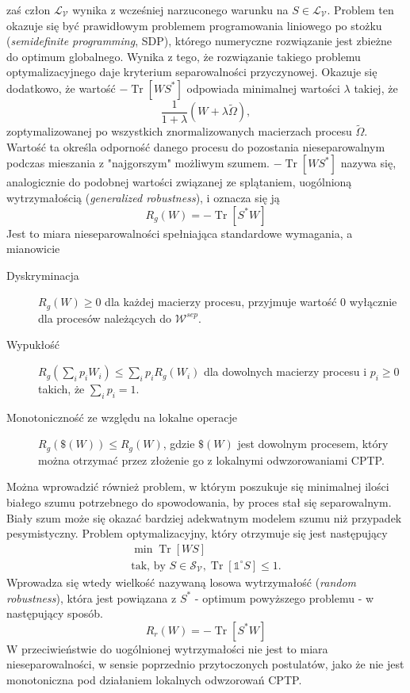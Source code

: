 \documentclass[10pt]{article} %
\DeclareMathOperator{\Trs}{Tr}
\newcommand{\IO}{\mathbb{1}^\circ}
\begin{document}
zaś człon $\mathcal{L_V}$ wynika z wcześniej narzuconego warunku na $S \in \mathcal{L_V}$. Problem ten okazuje się być prawidłowym problemem
programowania liniowego po stożku (\textit{semidefinite programming}, SDP), którego numeryczne rozwiązanie jest zbieżne do optimum globalnego.
Wynika z tego, że rozwiązanie takiego problemu optymalizacyjnego daje kryterium separowalności przyczynowej.
Okazuje się dodatkowo, że wartość $-\Trs \left[ W S^* \right]$ odpowiada minimalnej wartości $\lambda$ takiej, że 
\begin{equation}
\frac{1}{1 + \lambda}\left( W + \lambda\widetilde{\Omega}\right),
\end{equation}
zoptymalizowanej po wszystkich znormalizowanych macierzach procesu $\widetilde{\Omega}$. Wartość ta określa odporność danego procesu do pozostania nieseparowalnym podczas mieszania z "najgorszym" możliwym szumem. $-\Trs \left [ W S^* \right]$ nazywa się, analogicznie do podobnej wartości związanej ze splątaniem, uogólnioną wytrzymałością (\textit{generalized robustness}), i oznacza się ją
\begin{equation}
R_g(W) = -\Trs \left[ S^* W \right]
\end{equation} Jest to miara nieseparowalności spełniająca standardowe wymagania, a mianowicie
\begin{description}
\item[Dyskryminacja] $R_g(W) \geq 0$ dla każdej macierzy procesu, przyjmuje wartość 0 wyłącznie dla procesów należących do $\mathcal{W}^{sep}$. 
\item[Wypukłość] $R_g(\sum_i p_i W_i) \leq \sum_i p_i R_g(W_i)$ dla dowolnych macierzy procesu i $p_i \geq 0$ takich, że $\sum_i p_i = 1$. 
\item[Monotoniczność ze względu na lokalne operacje] $R_g\left(\$(W)\right) \leq R_g\left(W\right)$, gdzie $\$(W)$ jest dowolnym procesem, który można 
otrzymać przez złożenie go z lokalnymi odwzorowaniami CPTP.
\end{description}
Można wprowadzić również problem, w którym poszukuje się minimalnej ilości białego szumu potrzebnego do spowodowania, by proces stał się separowalnym. Biały szum może się okazać bardziej adekwatnym modelem szumu niż przypadek pesymistyczny.
Problem optymalizacyjny, który otrzymuje się jest następujący
\begin{gather}
\min \Trs \left[ WS \right]\\
\text{tak, by } S \in \mathcal{S_V}, \Trs\left[\IO S\right] \leq 1.
\end{gather}
Wprowadza się wtedy wielkość nazywaną losowa wytrzymałość (\textit{random robustness}), która jest powiązana z $S^*$ - optimum powyższego problemu - w następujący sposób.
\begin{equation}
R_r(W) = -\Trs\left[S^* W\right]
\end{equation}
W przeciwieństwie do uogólnionej wytrzymałości nie jest to miara nieseparowalności, w sensie poprzednio przytoczonych postulatów, jako że nie jest monotoniczna pod działaniem lokalnych odwzorowań CPTP.
\end{document}
